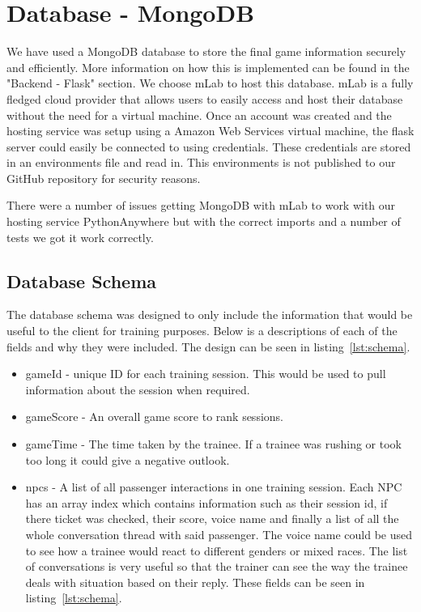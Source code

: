 \section{Database - MongoDB}
We have used a MongoDB database to store the final game information securely and efficiently. More information on how this is implemented can be found in the "Backend - Flask" section. We choose mLab to host this database. mLab is a fully fledged cloud provider that allows users to easily access and host their database without the need for a virtual machine. Once an account was created and the hosting service was setup using a Amazon Web Services virtual machine, the flask server could easily be connected to using credentials. These credentials are stored in an environments file and read in. This environments is not published to our GitHub repository for security reasons. 

There were a number of issues getting MongoDB with mLab to work with our hosting service PythonAnywhere but with the correct imports and a number of tests we got it work correctly.

\subsection{Database Schema}
The database schema was designed to only include the information that would be useful to the client for training purposes. Below is a descriptions of each of the fields and why they were included. The design can be seen in listing~\ref{lst:schema}.

\begin{itemize}
  \item gameId - unique ID for each training session. This would be used to pull information about the session when required.
  \item gameScore - An overall game score to rank sessions.
  \item gameTime - The time taken by the trainee. If a trainee was rushing or took too long it could give a negative outlook.
  \item npcs - A list of all passenger interactions in one training session. Each NPC has an array index which contains information such as their session id, if there ticket was checked, their score, voice name and finally a list of all the whole conversation thread with said passenger. The voice name could be used to see how a trainee would react to different genders or mixed races. The list of conversations is very useful so that the trainer can see the way the trainee deals with situation based on their reply. These fields can be seen in listing~\ref{lst:schema}. 
\end{itemize}

